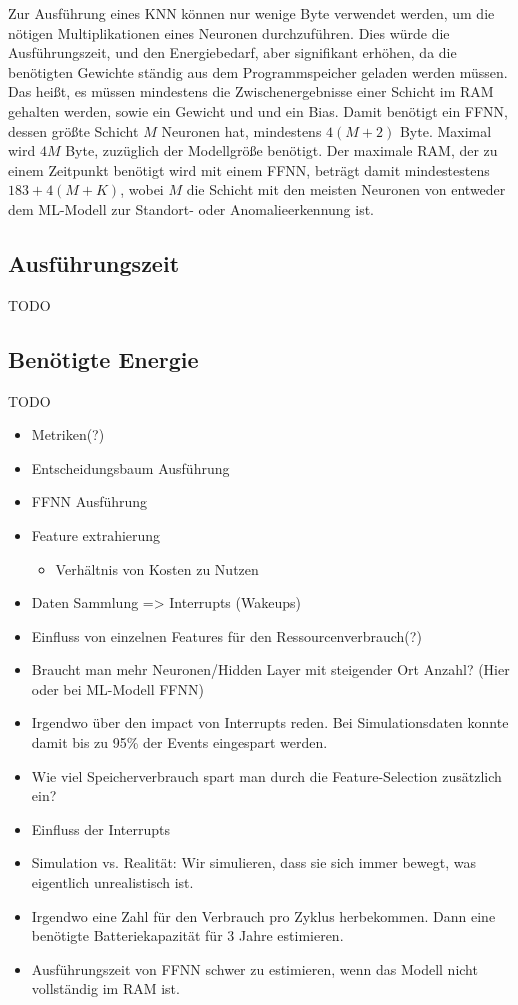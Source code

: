 \newline
\newline
Zur Ausführung eines KNN können nur wenige Byte verwendet werden, um die nötigen Multiplikationen eines Neuronen durchzuführen.
Dies würde die Ausführungszeit, und den Energiebedarf, aber signifikant erhöhen, da die benötigten Gewichte ständig aus dem Programmspeicher geladen werden müssen.
Das heißt, es müssen mindestens die Zwischenergebnisse einer Schicht im RAM gehalten werden, sowie ein Gewicht und und ein Bias.
Damit benötigt ein FFNN, dessen größte Schicht $M$ Neuronen hat, mindestens $4(M+2)$ Byte.
Maximal wird $4M$ Byte, zuzüglich der Modellgröße benötigt.
Der maximale RAM, der zu einem Zeitpunkt benötigt wird mit einem FFNN, beträgt damit mindestestens $183 + 4(M + K)$,
wobei $M$ die Schicht mit den meisten Neuronen von entweder dem ML-Modell zur Standort- oder Anomalieerkennung ist.

\subsection{Ausführungszeit}
TODO

\subsection{Benötigte Energie}
TODO

\begin{itemize}
    \item Metriken(?)
    \item Entscheidungsbaum Ausführung
    \item FFNN Ausführung
    \item Feature extrahierung
    \begin{itemize}
        \item Verhältnis von Kosten zu Nutzen
    \end{itemize}
    \item Daten Sammlung => Interrupts (Wakeups)
    \item Einfluss von einzelnen Features für den Ressourcenverbrauch(?)
    \item Braucht man mehr Neuronen/Hidden Layer mit steigender Ort Anzahl? (Hier oder bei ML-Modell FFNN)
    \item Irgendwo über den impact von Interrupts reden. Bei Simulationsdaten konnte damit bis zu 95\% der Events eingespart werden.
    \item Wie viel Speicherverbrauch spart man durch die Feature-Selection zusätzlich ein?
    \item Einfluss der Interrupts
    \item Simulation vs. Realität: Wir simulieren, dass sie sich immer bewegt, was eigentlich unrealistisch ist.
    \item Irgendwo eine Zahl für den Verbrauch pro Zyklus herbekommen. Dann eine benötigte Batteriekapazität für 3 Jahre estimieren.
    \item Ausführungszeit von FFNN schwer zu estimieren, wenn das Modell nicht vollständig im RAM ist.
\end{itemize}